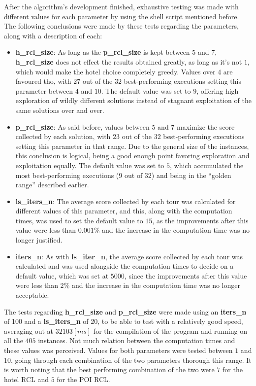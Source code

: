 After the algorithm's development finished, exhaustive testing was made with different values for each parameter by using the shell script mentioned before. The following conclusions were made by these tests regarding the parameters, along with a description of each:
\begin{itemize}
    \item \textbf{h\_rcl\_size}: As long as the \textbf{p\_rcl\_size} is kept between $5$ and $7$, \textbf{h\_rcl\_size} does not effect the results obtained greatly, as long as it's not $1$, which would make the hotel choice completely greedy. Values over $4$ are favoured tho, with $27$ out of the $32$ best-performing executions setting this parameter between $4$ and $10$. The default value was set to $9$, offering high exploration of wildly different solutions instead of stagnant exploitation of the same solutions over and over.
    \item \textbf{p\_rcl\_size}: As said before, values between $5$ and $7$ maximize the score collected by each solution, with $23$ out of the $32$ best-performing executions setting this parameter in that range. Due to the general size of the instances, this conclusion is logical, being a good enough point favoring exploration and exploitation equally. The default value was set to $5$, which accumulated the most best-performing executions ($9$ out of $32$) and being in the ``golden range'' described earlier.
    \item \textbf{ls\_iters\_n}: The average score collected by each tour was calculated for different values of this parameter, and this, along with the computation times, was used to set the default value to $15$, as the improvements after this value were less than $0.001\%$ and the increase in the computation time was no longer justified.
    \item \textbf{iters\_n}: As with \textbf{ls\_iter\_n}, the average score collected by each tour was calculated and was used alongside the computation times to decide on a default value, which was set at $5000$, since the improvements after this value were less than $2\%$ and the increase in the computation time was no longer acceptable.
\end{itemize}
The tests regarding \textbf{h\_rcl\_size} and \textbf{p\_rcl\_size} were made using an \textbf{iters\_n} of 100 and a \textbf{ls\_iters\_n} of 20, to be able to test with a relatively good speed, averaging out at $32103 [ms]$ for the compilation of the program and running on all the $405$ instances. Not much relation between the computation times and these values was perceived. Values for both parameters were tested between $1$ and $10$, going through each combination of the two parameters thorough this range. It is worth noting that the best performing combination of the two were $7$ for the hotel RCL and $5$ for the POI RCL.


